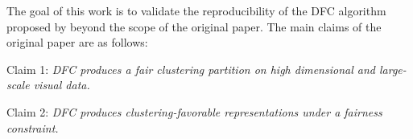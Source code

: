 
The goal of this work is to validate the reproducibility of the DFC algorithm proposed by  \citet{Li_2020_CVPR} beyond the scope of the original paper. The main claims of the original paper are as follows:

\begin{displayquote}
    Claim 1:
    \textit{DFC produces a fair clustering partition on high dimensional and large-scale visual data.}
\end{displayquote}
\begin{displayquote}
    Claim 2:
    \textit{DFC produces clustering-favorable representations under a fairness constraint.}
    \end{displayquote}
    
    
    
    
